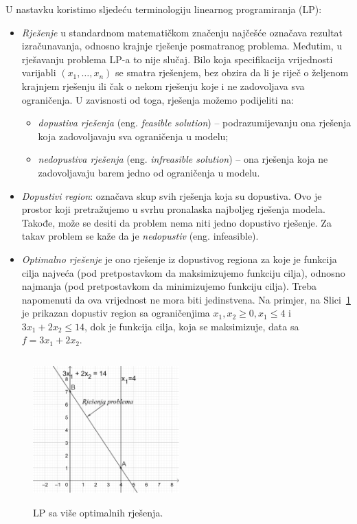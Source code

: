 \documentclass[a4paper, utf8, 11pt, colorlinks]{book}
\theoremstyle{definition}
\begin{document}
 U nastavku koristimo sljedeću terminologiju linearnog programiranja (LP):
\begin{itemize}
    \item \emph{Rješenje} u standardnom matematičkom značenju najčešće označava rezultat izračunavanja, odnosno krajnje rješenje posmatranog problema. Međutim, u rješavanju problema LP-a to  nije slučaj. Bilo koja specifikacija vrijednosti varijabli  $(x_1,\ldots, x_n)$ se smatra rješenjem, bez obzira da li je riječ o željenom krajnjem rješenju ili čak o nekom rješenju koje i ne zadovoljava sva ograničenja. U zavisnosti od toga, rješenja  možemo podijeliti na:
    \begin{itemize}
        \item \emph{dopustiva rješenja} (eng. \emph{feasible solution}) -- podrazumijevanju ona rješenja koja zadovoljavaju sva ograničenja u modelu;
        \item \emph{nedopustiva rješenja} (eng. \emph{infreasible solution}) -- ona rješenja koja ne zadovoljavaju barem jedno od ograničenja u modelu. 
    \end{itemize}
  \item \emph{Dopustivi region}: označava skup svih rješenja koja su dopustiva. Ovo je prostor koji pretražujemo u svrhu pronalaska najboljeg rješenja modela. Takođe, može se desiti da problem nema niti jedno dopustivo rješenje. Za takav problem se kaže da je \emph{nedopustiv} (eng. infeasible). 
  \item \emph{Optimalno rješenje} je ono rješenje iz dopustivog regiona za koje je funkcija cilja najveća (pod pretpostavkom da maksimizujemo funkciju cilja), odnosno najmanja (pod pretpostavkom da minimizujemo funkciju cilja). Treba napomenuti da ova vrijednost ne mora biti jedinstvena.  Na primjer, na Slici~\ref{fig:multi_solution} je prikazan dopustiv region sa ograničenjima $x_1, x_2 \geq 0, x_1 \leq 4 $ i $3 x_1 + 2 x_2 \leq 14$, dok je funkcija cilja, koja se maksimizuje, data sa $f = 3x_1 + 2 x_2$.  
 \end{itemize}
 
 \begin{figure}
     \centering
     \includegraphics[width=160pt, height=160pt]{fig3.eps}
     \caption{LP sa više optimalnih rješenja.}
     \label{fig:multi_solution}
 \end{figure}
 
\end{document}
